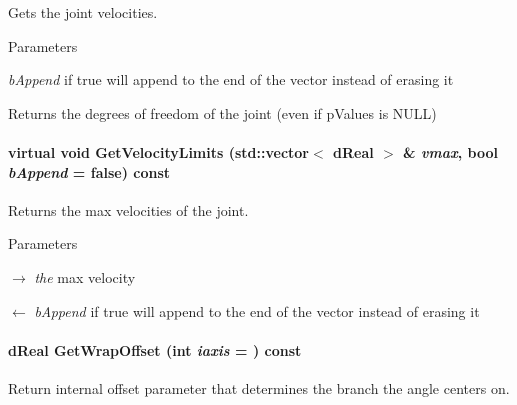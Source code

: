 Gets the joint velocities. 


\begin{DoxyParams}{Parameters}
\item[{\em bAppend}]if true will append to the end of the vector instead of erasing it \end{DoxyParams}
\begin{DoxyReturn}{Returns}
the degrees of freedom of the joint (even if pValues is NULL) 
\end{DoxyReturn}
\hypertarget{classOpenRAVE_1_1KinBody_1_1Joint_acb05f676c90a3c2f07586b09e8ff07c4}{
\paragraph[{GetVelocityLimits}]{\setlength{\rightskip}{0pt plus 5cm}virtual void GetVelocityLimits (std::vector$<$ dReal $>$ \& {\em vmax}, \/  bool {\em bAppend} = {\ttfamily false}) const}\hfill}
\label{classOpenRAVE_1_1KinBody_1_1Joint_acb05f676c90a3c2f07586b09e8ff07c4}


Returns the max velocities of the joint. 


\begin{DoxyParams}{Parameters}
\item[\mbox{$\rightarrow$} {\em the}]max velocity \item[\mbox{$\leftarrow$} {\em bAppend}]if true will append to the end of the vector instead of erasing it \end{DoxyParams}
\hypertarget{classOpenRAVE_1_1KinBody_1_1Joint_a9dede60d3c61a885dc1b98fe86e85727}{
\paragraph[{GetWrapOffset}]{\setlength{\rightskip}{0pt plus 5cm}dReal GetWrapOffset (int {\em iaxis} = {}) const}\hfill}
\label{classOpenRAVE_1_1KinBody_1_1Joint_a9dede60d3c61a885dc1b98fe86e85727}


Return internal offset parameter that determines the branch the angle centers on. 

